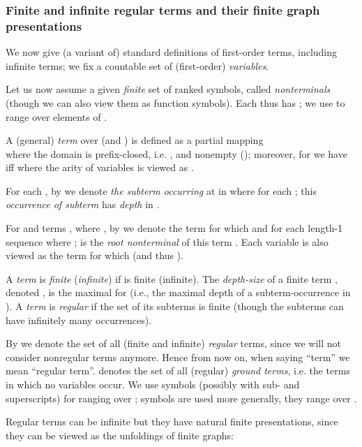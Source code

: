 \documentclass[12pt]{article}
\begin{document}
\subsubsection*{Finite and infinite regular terms and their
finite graph presentations} 

We now give (a variant of) standard definitions of first-order terms,
including infinite terms;
we fix a countable set 
 of (first-order) \emph{variables}.

Let us now assume  a given \emph{finite} set  of 
ranked symbols, called \emph{nonterminals}
(though we can also view them as function symbols).
Each  thus has  ; we use  to range
over elements of .

A (general) \emph{term}  over  (and ) is defined as a
partial mapping 
\\
where  
the domain  is prefix-closed,
i.e. , and nonempty ();
moreover, for  we have 
 iff  where the arity of variables  is viewed as
.

For each , by  we denote
\emph{the subterm occurring} at  in  where
 for each 
;
this \emph{occurrence of subterm}  has \emph{depth}
 in . 

For  and terms , where 
, by  we denote the term  for which
 and  for each length-1 sequence 
where ;  is the \emph{root nonterminal} of this term
. Each variable  is also viewed as
the term  for which  
(and thus ). 

A \emph{term}  is \emph{finite} (\emph{infinite})
if  is finite (infinite).
The \emph{depth-size} of a finite term , denoted ,
is the maximal  for 
(i.e., the maximal depth of a subterm-occurrence in ).
A \emph{term} is \emph{regular} if the set of its subterms
is finite 
(though the subterms can have infinitely many occurrences).

By  we denote the set of all
(finite and infinite) \emph{regular} terms, since we will not consider
nonregular terms anymore.
Hence from now on, when saying ``term'' we mean ``regular term''. 
 denotes the set of all (regular)
\emph{ground terms}, i.e. the terms  in which no  variables 
occur.
We use symbols  (possibly with sub- and
superscripts) for ranging over ;
symbols  
are used more generally, they range over .





Regular terms can be infinite but they have natural finite
presentations, since they can be viewed as the unfoldings of finite
graphs: 
\end{document}
